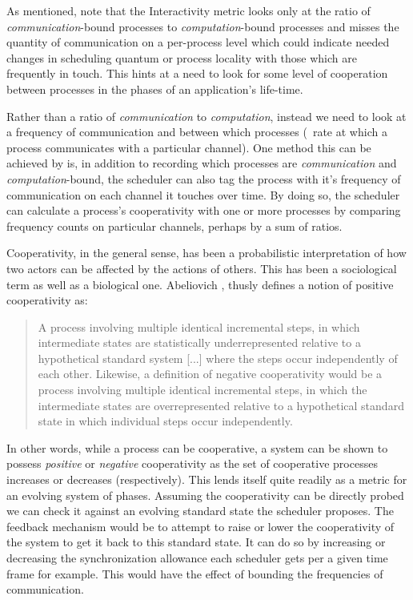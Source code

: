 
As mentioned, note that the Interactivity metric looks only at the ratio of {\em communication}-bound processes to {\em computation}-bound
processes and misses the quantity of communication on a per-process level which could indicate needed changes in
scheduling quantum or process locality with those which are frequently in touch. 
This hints at a need to look for some level of cooperation between processes in the phases of an application's
life-time. 

Rather than a ratio of {\em communication} to {\em computation}, instead we need to look at a 
frequency of communication and between which processes (\ie~rate at which a process communicates with a particular
channel). One method this can be achieved by is, in addition to recording which processes are {\em communication} and 
{\em computation}-bound, the scheduler can also tag the process with it's frequency of communication on each 
channel it touches over time. By doing so, the scheduler can calculate a process's cooperativity with one or more
processes by comparing frequency counts on particular channels, perhaps by a sum of ratios.

Cooperativity, in the general sense, has been a probabilistic interpretation of how two actors can be affected by the actions of
others. This has been a sociological term as well as a biological one. Abeliovich \cite{abeliovich2005empirical}, thusly defines a
notion of positive cooperativity as: 
\begin{quote}
A process involving multiple identical incremental steps, in which intermediate states are statistically underrepresented relative to a hypothetical standard system [...] where the steps occur independently of each other. Likewise, a definition of negative cooperativity would be a process involving multiple identical incremental steps, in which the intermediate states are overrepresented relative to a hypothetical standard state in which individual steps occur independently.
\end{quote}

In other words, while a process can be cooperative, a system can be shown to possess {\em positive} or {\em negative}
cooperativity as the set of cooperative processes increases or decreases (respectively). This lends itself quite 
readily as a metric for an evolving system of phases. Assuming the cooperativity can be directly probed we can check 
it against an evolving standard state the scheduler proposes. The feedback mechanism would be to attempt to raise or
lower the cooperativity of the system to get it back to this standard state. It can do so by increasing or decreasing
the synchronization allowance each scheduler gets per a given time frame for example. This would have the effect of 
bounding the frequencies of communication.

